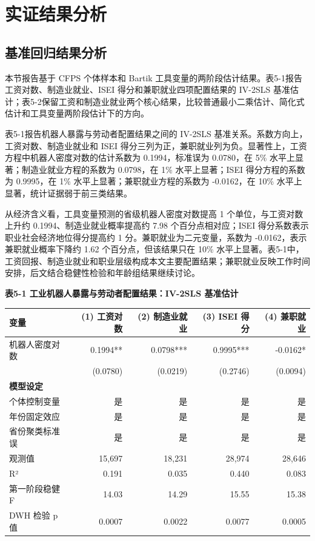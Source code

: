 \documentclass[UTF8, zihao=-4, a4paper, openany, fontset=none]{ctexrep}
\newcounter{none}
\numberwithin{equation}{chapter}
\begin{document}
\chapter{实证结果分析}\label{ux5b9eux8bc1ux7ed3ux679cux5206ux6790}

\section{基准回归结果分析}\label{ux57faux51c6ux56deux5f52ux7ed3ux679cux5206ux6790}

本节报告基于 CFPS 个体样本和 Bartik 工具变量的两阶段估计结果。表5-1报告工资对数、制造业就业、ISEI 得分和兼职就业四项配置结果的 IV-2SLS 基准估计；表5-2保留工资和制造业就业两个核心结果，比较普通最小二乘估计、简化式估计和工具变量两阶段估计下的方向。

表5-1报告机器人暴露与劳动者配置结果之间的 IV-2SLS 基准关系。系数方向上，工资对数、制造业就业和 ISEI 得分三列为正，兼职就业列为负。显著性上，工资方程中机器人密度对数的估计系数为 0.1994，标准误为 0.0780，在 5\% 水平上显著；制造业就业方程的系数为 0.0798，在 1\% 水平上显著；ISEI 得分方程的系数为 0.9995，在 1\% 水平上显著；兼职就业方程的系数为 -0.0162，在 10\% 水平上显著，统计证据弱于前三类结果。

从经济含义看，工具变量预测的省级机器人密度对数提高 1 个单位，与工资对数上升约 0.1994、制造业就业概率提高约 7.98 个百分点相对应；ISEI 得分系数表示职业社会经济地位得分提高约 1 分。兼职就业为二元变量，系数为 -0.0162，表示兼职就业概率下降约 1.62 个百分点，但该结果只在 10\% 水平上显著。表5-1中，工资回报、制造业就业和职业层级构成本文主要配置结果；兼职就业反映工作时间安排，后文结合稳健性检验和年龄组结果继续讨论。

\textbf{表5-1 工业机器人暴露与劳动者配置结果：IV-2SLS 基准估计}

{\def\LTcaptype{none} %
\begin{longtable}[]{@{}lrrrr@{}}
\toprule\noalign{}
变量 & (1) 工资对数 & (2) 制造业就业 & (3) ISEI 得分 & (4) 兼职就业 \\
\midrule\noalign{}
\endhead
\bottomrule\noalign{}
\endlastfoot
机器人密度对数 & 0.1994** & 0.0798*** & 0.9995*** & -0.0162* \\
& (0.0780) & (0.0219) & (0.2746) & (0.0094) \\
\textbf{模型设定} & & & & \\
个体控制变量 & 是 & 是 & 是 & 是 \\
年份固定效应 & 是 & 是 & 是 & 是 \\
省份聚类标准误 & 是 & 是 & 是 & 是 \\
观测值 & 15,697 & 18,231 & 28,974 & 28,646 \\
R² & 0.191 & 0.035 & 0.440 & 0.083 \\
第一阶段稳健 F & 14.03 & 14.29 & 15.55 & 15.38 \\
DWH 检验 p 值 & 0.0007 & 0.0022 & 0.0077 & 0.0005 \\
\end{longtable}
}
\end{document}
